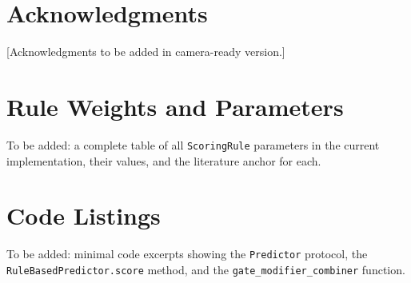 \documentclass[11pt,a4paper]{article}
\begin{document}
\section*{Acknowledgments}

[Acknowledgments to be added in camera-ready version.]



\appendix

\section{Rule Weights and Parameters}

To be added: a complete table of all \texttt{ScoringRule} parameters in the current implementation, their values, and the literature anchor for each.

\section{Code Listings}

To be added: minimal code excerpts showing the \texttt{Predictor} protocol, the \texttt{RuleBasedPredictor.score} method, and the \texttt{gate\_modifier\_combiner} function.
\end{document}

